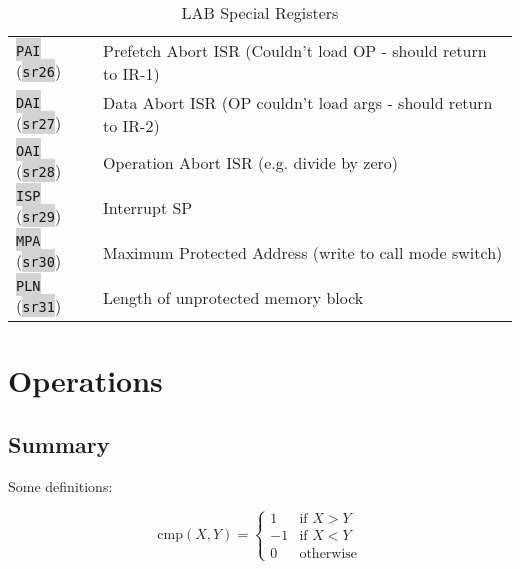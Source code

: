\documentclass{article}
\newcommand{\labcode}[1]{\colorbox{lightgray}{\lstinline[language=lab]{#1}}}
\begin{document}
\begin{table}[h!]
\begin{tabular}{ll}
    \labcode{PAI} (\labcode{sr26}) & Prefetch Abort ISR (Couldn't load OP - should return to IR-1) \\
    \labcode{DAI} (\labcode{sr27}) & Data Abort ISR (OP couldn't load args - should return to IR-2) \\
    \labcode{OAI} (\labcode{sr28}) & Operation Abort ISR (e.g. divide by zero) \\
    \labcode{ISP} (\labcode{sr29}) & Interrupt SP \\
    \labcode{MPA} (\labcode{sr30}) & Maximum Protected Address (write to call mode switch) \\
    \labcode{PLN} (\labcode{sr31}) & Length of unprotected memory block \\
\end{tabular}
\caption{LAB Special Registers}
\label{table:sregisters}
\end{table}

\section{Operations}

\subsection{Summary}

Some definitions:

$$\mbox{cmp}(X,Y) = \begin{cases}
    1 & \mbox{if } X > Y \\
    -1 & \mbox{if } X < Y \\
    0 & \mbox{otherwise}
\end{cases}$$
\end{document}
